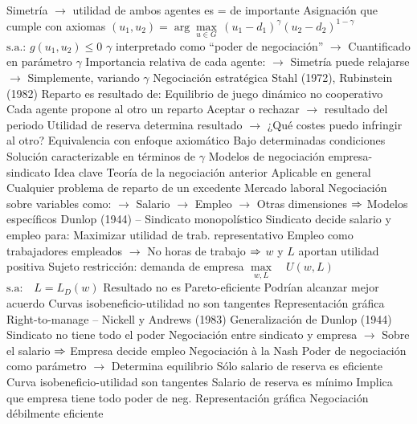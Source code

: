 \documentclass{nuevotema}
\begin{document}
\begin{esquemal}
				\4[] Simetría
				\4[] $\to$ utilidad de ambos agentes es = de importante
				\4 Asignación que cumple con axiomas
				\4[] $(u_1, u_2) = \arg \underset{u \in G}{\max} \, (u_1-d_1)^\gamma(u_2 - d_2)^{1-\gamma}$
				\4[] $ \text{s.a.}: \, g(u_1,u_2) \leq 0$
				\4[] $\gamma$ interpretado como ``poder de negociación''
				\4[] $\to$ Cuantificado en parámetro $\gamma$
				\4[] Importancia relativa de cada agente:
				\4[] $\to$ Simetría puede relajarse
				\4[] $\to$ Simplemente, variando $\gamma$
			\3 Negociación estratégica
				\4 Stahl (1972), Rubinstein (1982)
				\4 Reparto es resultado de:
				\4[] Equilibrio de juego dinámico no cooperativo
				\4 Cada agente propone al otro un reparto
				\4[] Aceptar o rechazar $\to$ resultado del periodo
				\4[] Utilidad de reserva determina resultado
				\4[] $\to$ ¿Qué costes puedo infringir al otro?
				\4 Equivalencia con enfoque axiomático
				\4[] Bajo determinadas condiciones
				\4[] Solución caracterizable en términos de $\gamma$
		\2 Modelos de negociación empresa-sindicato
			\3 Idea clave
				\4 Teoría de la negociación anterior
				\4[] Aplicable en general
				\4[] Cualquier problema de reparto de un excedente
				\4 Mercado laboral
				\4[] Negociación sobre variables como:
				\4[] $\to$ Salario
				\4[] $\to$ Empleo
				\4[] $\to$ Otras dimensiones
				\4[] $\Rightarrow$ Modelos específicos
			\3 Dunlop (1944) -- Sindicato monopolístico
				\4 Sindicato decide salario y empleo para:
				\4[] Maximizar utilidad de trab. representativo
				\4[] Empleo como trabajadores empleados
				\4[] $\to$ No horas de trabajo
				\4[] $\Rightarrow$ $w$ y $L$ aportan utilidad positiva
				\4[] Sujeto restricción: demanda de empresa
				\4[] $\underset{w, L}{\max} \quad U(w,L)$
				\4[] $\text{s.a:} \quad L = L_D (w)$
				\4 Resultado no es Pareto-eficiente
				\4[] Podrían alcanzar mejor acuerdo
				\4[] Curvas isobeneficio-utilidad no son tangentes
				\4 Representación gráfica
				\4[] 
			\3 Right-to-manage -- Nickell y Andrews (1983)
				\4 Generalización de Dunlop (1944)
				\4 Sindicato no tiene todo el poder
				\4 Negociación entre sindicato y empresa
				\4[] $\to$ Sobre el salario
				\4[] $\Rightarrow$ Empresa decide empleo
				\4[] Negociación à la Nash
				\4[] Poder de negociación como parámetro
				\4[] $\to$ Determina equilibrio
				\4 Sólo salario de reserva es eficiente
				\4[] Curva isobeneficio-utilidad son tangentes
				\4[] Salario de reserva es mínimo
				\4[] Implica que empresa tiene todo poder de neg.
				\4 Representación gráfica
				\4[] 
			\3 Negociación débilmente eficiente

\end{esquemal}
\end{document}
